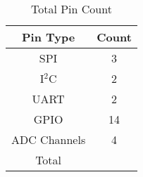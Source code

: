 \begin{table}[H]
\setlength{\extrarowheight}{1.5pt}
  \centering
  \caption{Total Pin Count}
    \begin{tabular}{|c|c|}
    \hline
    Pin Type  & Count \\
    \hline \hline
   	SPI & 3 \\ \hline
   	I$^2$C & 2 \\ \hline
   	UART & 2 \\ \hline
   	GPIO & 14 \\ \hline
   	ADC Channels & 4 \\ \hline \hline
   	Total & \\ \hline
    \end{tabular}%
  \label{tab:pinCountTotal}%
\end{table}%

